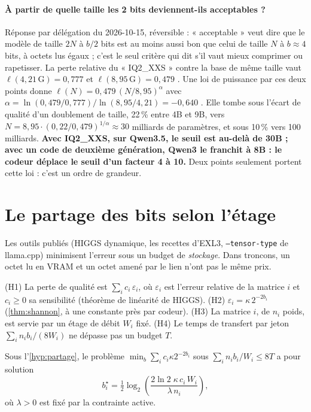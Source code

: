 \paragraph{À partir de quelle taille les 2 bits deviennent-ils acceptables ?} Réponse par délégation du 2026-10-15, réversible : « acceptable » veut dire que le modèle de taille $2N$ à $b/2$ bits est au moins aussi bon que celui de taille $N$ à $b \approx 4$ bits, à octets lus égaux ; c'est le seul critère qui dit s'il vaut mieux comprimer ou rapetisser. La perte relative du « IQ2\_XXS » contre la base de même taille vaut $\ell(4{,}21\,\mathrm{G}) = 0{,}777$ et $\ell(8{,}95\,\mathrm{G}) = 0{,}479$ \mes. Une loi de puissance par ces deux points donne $\ell(N) = 0{,}479\,(N/8{,}95)^{\alpha}$ avec $\alpha = \ln(0{,}479/0{,}777)/\ln(8{,}95/4{,}21) = -0{,}640$ \calc. Elle tombe sous l'écart de qualité d'un doublement de taille, 22\,\% entre 4B et 9B, vers $N = 8{,}95 \cdot (0{,}22/0{,}479)^{1/\alpha} \approx 30$ milliards de paramètres, et sous 10\,\% vers 100 milliards. \textbf{Avec IQ2\_XXS, sur Qwen3.5, le seuil est au-delà de 30B ; avec un code de deuxième génération, Qwen3 le franchit à 8B : le codeur déplace le seuil d'un facteur 4 à 10.} Deux points seulement portent cette loi : c'est un ordre de grandeur.

\section{Le partage des bits selon l'étage}\label{sec:partage-bits}

Les outils publiés (HIGGS dynamique, les recettes d'EXL3, \texttt{--tensor-type} de llama.cpp) minimisent l'erreur sous un budget de \emph{stockage}. Dans troncons, un octet lu en VRAM et un octet amené par le lien n'ont pas le même prix.

\begin{hypothese}\label{hyp:partage}
(H1) La perte de qualité est $\sum_i c_i\, \varepsilon_i$, où $\varepsilon_i$ est l'erreur relative de la matrice $i$ et $c_i \ge 0$ sa sensibilité (théorème de linéarité de HIGGS). (H2) $\varepsilon_i = \kappa\, 2^{-2b_i}$ (\cref{thm:shannon}, à une constante près par codeur). (H3) La matrice $i$, de $n_i$ poids, est servie par un étage de débit $W_i$ fixé. (H4) Le temps de transfert par jeton $\sum_i n_i b_i / (8 W_i)$ ne dépasse pas un budget $T$.
\end{hypothese}

\begin{proposition}\label{prop:partage}
Sous l'\cref{hyp:partage}, le problème $\min_b \sum_i c_i \kappa 2^{-2b_i}$ sous $\sum_i n_i b_i / W_i \le 8T$ a pour solution
\begin{equation}\label{eq:partage}
b_i^\star = \tfrac12 \log_2\!\left(\frac{2 \ln 2 \;\kappa\, c_i \, W_i}{\lambda\, n_i}\right),
\end{equation}
où $\lambda > 0$ est fixé par la contrainte active.
\end{proposition}

